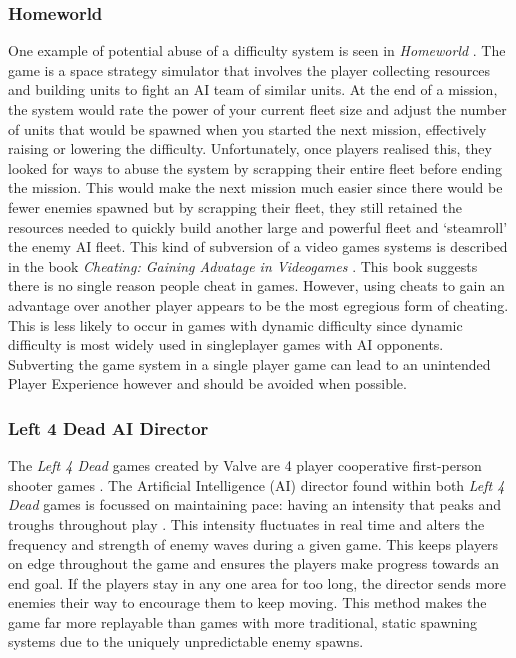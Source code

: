 \documentclass[journal]{IEEEtran}
\begin{document}
\subsubsection{Homeworld}
One example of potential abuse of a difficulty system is seen in \textit{Homeworld} \cite{game:homeworld}. The game is a space strategy simulator that involves the player collecting resources and building units to fight an AI team of similar units. At the end of a mission, the system would rate the power of your current fleet size and adjust the number of units that would be spawned when you started the next mission, effectively raising or lowering the difficulty. Unfortunately, once players realised this, they looked for ways to abuse the system by scrapping their entire fleet before ending the mission. This would make the next mission much easier since there would be fewer enemies spawned but by scrapping their fleet, they still retained the resources needed to quickly build another large and powerful fleet and `steamroll' the enemy AI fleet. 
This kind of subversion of a video games systems is described in the book \textit{Cheating: Gaining Advatage in Videogames} \cite{consalvo2009cheating}. This book suggests there is no single reason people cheat in games. However, using cheats to gain an advantage over another player appears to be the most egregious form of cheating. This is less likely to occur in games with dynamic difficulty since dynamic difficulty is most widely used in singleplayer games with AI opponents. Subverting the game system in a single player game can lead to an unintended Player Experience however and should be avoided when possible.


\subsubsection{Left 4 Dead AI Director}
The \textit{Left 4 Dead} games created by Valve are 4 player cooperative first-person shooter games \cite{game:left4dead} \cite{game:left4dead2}. The Artificial Intelligence (AI) director found within both \textit{Left 4 Dead} games is focussed on maintaining pace: having an intensity that peaks and troughs throughout play \cite{booth2009ai}. This intensity fluctuates in real time and alters the frequency and strength of enemy waves during a given game. This keeps players on edge throughout the game and ensures the players make progress towards an end goal. If the players stay in any one area for too long, the director sends more enemies their way to encourage them to keep moving. This method makes the game far more replayable than games with more traditional, static spawning systems due to the uniquely unpredictable enemy spawns.
\end{document}
